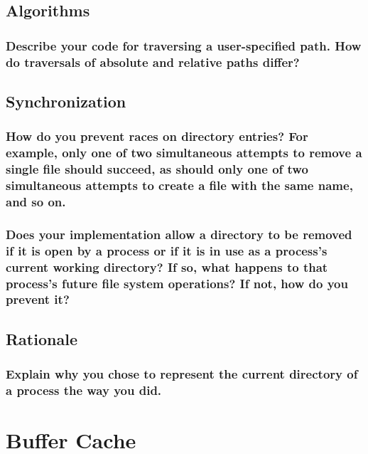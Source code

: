 \documentclass[sigconf, nonacm, balance=false, urlbreakonhyphens=true]{acmart}
\begin{document}
        \subsection{Algorithms}

            \subsubsection{Describe your code for traversing a user-specified path.  How do traversals of absolute and relative paths differ? } 
        
        \subsection{Synchronization}

            \subsubsection{How do you prevent races on directory entries?  For example, only one of two simultaneous attempts to remove a single file should succeed, as should only one of two simultaneous attempts to create a file with the same name, and so on. }

            \subsubsection{Does your implementation allow a directory to be removed if it is open by a process or if it is in use as a process's current working directory?  If so, what happens to that process's future file system operations?  If not, how do you prevent it? }
        
        \subsection{Rationale}

            \subsubsection{Explain why you chose to represent the current directory of a process the way you did. }
    
    \section{Buffer Cache}

        \label{Buffer Cache}
\end{document}
